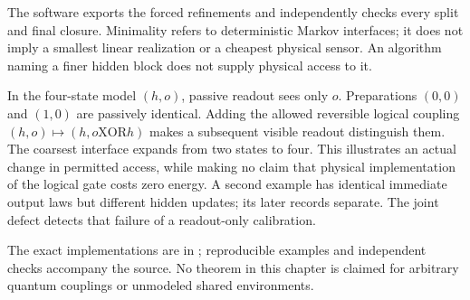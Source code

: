 The software exports the forced refinements and independently checks every
split and final closure. Minimality refers to deterministic Markov interfaces;
it does not imply a smallest linear realization or a cheapest physical sensor.
An algorithm naming a finer hidden block does not supply physical access to it.

In the four-state model $(h,o)$, passive readout sees only $o$. Preparations
$(0,0)$ and $(1,0)$ are passively identical. Adding the allowed reversible
logical coupling $(h,o)\mapsto(h,o\mathbin{\mathrm{XOR}}h)$ makes a subsequent
visible readout distinguish them. The coarsest interface expands from two
states to four. This illustrates an actual change in permitted access, while
making no claim that physical implementation of the logical gate costs zero
energy. A second example has identical immediate output laws but different
hidden updates; its later records separate. The joint defect detects that
failure of a readout-only calibration.

The exact implementations are in
; reproducible examples
and independent checks accompany the source. No theorem in this chapter is
claimed for arbitrary quantum couplings or unmodeled shared environments.
